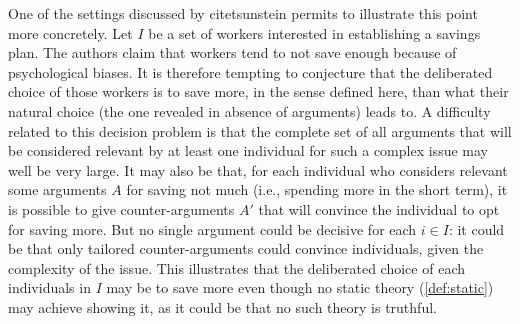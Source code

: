 \documentclass[version=last, pagesize, twoside=off, bibliography=totoc, DIV=calc, fontsize=12pt, a4paper, french, english]{scrartcl}
\begin{document}
One of the settings discussed by citet{sunstein} permits to illustrate this point more concretely.
Let $I$ be a set of workers interested in establishing a savings plan. 
The authors claim that workers tend to not save enough because of psychological biases. 
It is therefore tempting to conjecture that the deliberated choice of those workers is to save more, in the sense defined here, than what their natural choice (the one revealed in absence of arguments) leads to.
A difficulty related to this decision problem is that the complete set of all arguments that will be considered relevant by at least one individual for such a complex issue may well be very large. It may also be that, for each individual who considers relevant some arguments $A$ for saving not much (i.e., spending more in the short term), it is possible to give counter-arguments $A'$ that will convince the individual to opt for saving more.
But no single argument could be decisive for each $i \in I$: it could be that only tailored counter-arguments could convince individuals, given the complexity of the issue.
This illustrates that the deliberated choice of each individuals in $I$ may be to save more even though no static theory (\cref{def:static}) may achieve showing it, as it could be that no such theory is truthful.

\end{document}
